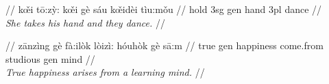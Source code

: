 \documentclass{article}
\begin{document}
\ex
\begingl
\gla {}       //
\glb k\v{\oe}i t\=o:z\`y: k\v{\oe}i g\`e s\'{a}u k\v{\oe}id\`ei t\`iu:m\v{o}u //
 hold {\sc 3sg} {\sc gen} hand {\sc 3pl} dance //
\\\textit{She takes his hand and they dance.} //
\endgl
\xe

\ex
\begingl
\gla {}       //
\glb z\=anz\`{i}ng g\`e f\`a:il\`ok l\`oiz\`{i}: h\'{o}uh\`ok g\`e s\=a:m //
\glc true {\sc gen} happiness come.from studious {\sc gen} mind //
\\\textit{True happiness arises from a learning mind.} //
\endgl
\xe
\end{document}
